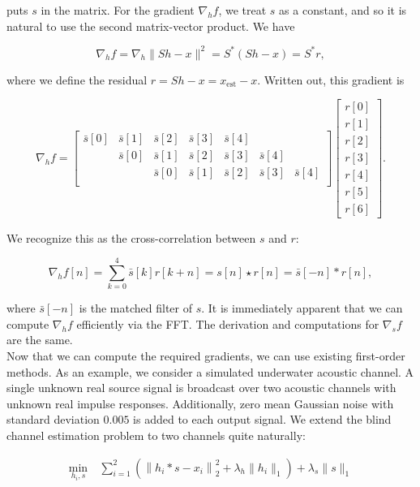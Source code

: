 \documentclass[journal]{IEEEtran}
\begin{document}
\noindent puts $s$ in the matrix.  For the gradient $\nabla_hf$, we treat $s$ as a constant, and so it is natural to use the second matrix-vector product.  We have

\[ \nabla_hf = \nabla_h\|Sh-x\|^2 = S^\ast(Sh-x) = S^\ast r, \] 

\noindent where we define the residual $r=Sh-x = x_\text{est}-x$.  Written out, this gradient is

\[ \nabla_h f = \begin{bmatrix} \bar{s}[0]&\bar{s}[1]&\bar{s}[2]&\bar{s}[3]&\bar{s}[4]\\&\bar{s}[0]&\bar{s}[1]&\bar{s}[2]&\bar{s}[3]&\bar{s}[4]\\&&\bar{s}[0]&\bar{s}[1]&\bar{s}[2]&\bar{s}[3]&\bar{s}[4]\\\end{bmatrix}\begin{bmatrix}r[0]\\r[1]\\r[2]\\r[3]\\r[4]\\r[5]\\r[6]\end{bmatrix}. \] 

\noindent We recognize this as the cross-correlation between $s$ and $r$:

\[ \nabla_h f[n] = \sum_{k=0}^4 \bar{s}[k]r[k+n] = s[n]\star r[n] = \bar{s}[-n]\ast r[n], \]

\noindent where $\bar{s}[-n]$ is the matched filter of $s$.  It is immediately apparent that we can compute $\nabla_hf$ efficiently via the FFT.  The derivation and computations for $\nabla_sf$ are the same.\\

Now that we can compute the required gradients, we can use existing first-order methods.  As an example, we consider a simulated underwater acoustic channel.  A single unknown real source signal is broadcast over two acoustic channels with unknown real impulse responses.  Additionally, zero mean Gaussian noise with standard deviation $0.005$ is added to each output signal.  We extend the blind channel estimation problem to two channels quite naturally:

\begin{align*}
   \min_{h_i,s} ~&\sum_{i=1}^2\left(\left\|h_i\ast s - x_i\right\|_2^2 + \lambda_{h}\|h_i\|_1\right) + \lambda_s\|s\|_1
\end{align*}
\end{document}
